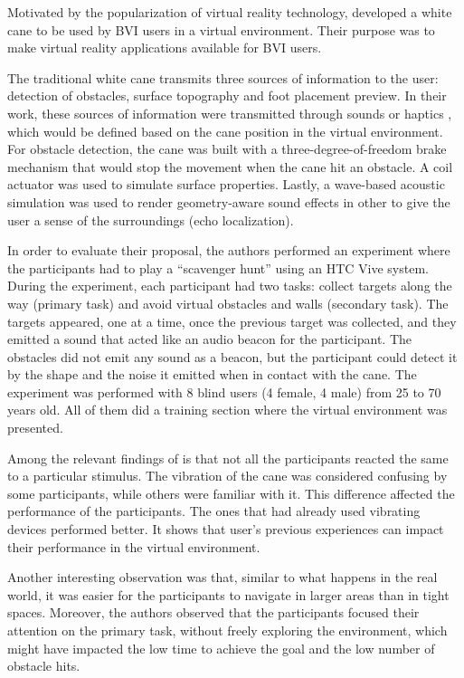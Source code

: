 Motivated by the popularization of virtual reality technology,  developed a white cane to be used by BVI users in a virtual environment. Their purpose was to make virtual reality applications available for BVI users. 

The traditional white cane transmits three sources of information to the user: detection of obstacles, surface topography and foot placement preview. In their work, these sources of information were transmitted through sounds or haptics \cite{siu2020virtual}, which would be defined based on the cane position in the virtual environment. For obstacle detection, the cane was built with a three-degree-of-freedom brake mechanism that would stop the movement when the cane hit an obstacle. A coil actuator was used to simulate surface properties. Lastly, a wave-based acoustic simulation was used to render geometry-aware sound effects in other to give the user a sense of the surroundings (echo localization).

In order to evaluate their proposal, the authors performed an experiment where the participants had to play a “scavenger hunt” using an HTC Vive system. During the experiment, each participant had two tasks: collect targets along the way (primary task) and avoid virtual obstacles and walls (secondary task). The targets appeared, one at a time, once the previous target was collected, and they emitted a sound that acted like an audio beacon for the participant. The obstacles did not emit any sound as a beacon, but the participant could detect it by the shape and the noise it emitted when in contact with the cane. The experiment was performed with 8 blind users (4 female, 4 male) from 25 to 70 years old. All of them did a training section where the virtual environment was presented. 

Among the relevant findings of  is that not all the participants reacted the same to a particular stimulus. The vibration of the cane was considered confusing by some participants, while others were familiar with it. This difference affected the performance of the participants. The ones that had already used vibrating devices performed better. It shows that user's previous experiences can impact their performance in the virtual environment.

Another interesting observation was that, similar to what happens in the real world, it was easier for the participants to navigate in larger areas than in tight spaces. Moreover, the authors observed that the participants focused their attention on the primary task, without freely exploring the environment, which might have impacted the low time to achieve the goal and the low number of obstacle hits. 

